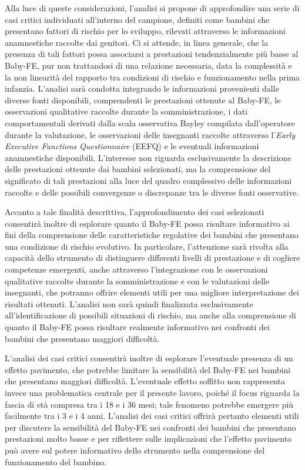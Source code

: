 Alla luce di queste considerazioni, l'analisi si propone di approfondire una serie di casi critici individuati all'interno del campione, definiti come bambini che presentano fattori di rischio per lo sviluppo, rilevati attraverso le informazioni anamnestiche raccolte dai genitori. Ci si attende, in linea generale, che la presenza di tali fattori possa associarsi a prestazioni tendenzialmente più basse al Baby-FE, pur non trattandosi di una relazione necessaria, data la complessità e la non linearità del rapporto tra condizioni di rischio e funzionamento nella prima infanzia. L'analisi sarà condotta integrando le informazioni provenienti dalle diverse fonti disponibili, comprendenti le prestazioni ottenute al Baby-FE, le osservazioni qualitative raccolte durante la somministrazione, i dati comportamentali derivati dalla scala osservativa Bayley compilata dall'operatore durante la valutazione, le osservazioni delle insegnanti raccolte attraverso l'\emph{Early Executive Functions Questionnaire} (EEFQ) e le eventuali informazioni anamnestiche disponibili. L'interesse non riguarda esclusivamente la descrizione delle prestazioni ottenute dai bambini selezionati, ma la comprensione del significato di tali prestazioni alla luce del quadro complessivo delle informazioni raccolte e delle possibili convergenze o discrepanze tra le diverse fonti osservative.

Accanto a tale finalità descrittiva, l'approfondimento dei casi selezionati consentirà inoltre di esplorare quanto il Baby-FE possa risultare informativo ai fini della comprensione delle caratteristiche regolative dei bambini che presentano una condizione di rischio evolutivo. In particolare, l'attenzione sarà rivolta alla capacità dello strumento di distinguere differenti livelli di prestazione e di cogliere competenze emergenti, anche attraverso l'integrazione con le osservazioni qualitative raccolte durante la somministrazione e con le valutazioni delle insegnanti, che potranno offrire elementi utili per una migliore interpretazione dei risultati ottenuti. L'analisi non sarà quindi finalizzata esclusivamente all'identificazione di possibili situazioni di rischio, ma anche alla comprensione di quanto il Baby-FE possa risultare realmente informativo nei confronti dei bambini che presentano maggiori difficoltà.

L'analisi dei casi critici consentirà inoltre di esplorare l'eventuale presenza di un effetto pavimento, che potrebbe limitare la sensibilità del Baby-FE nei bambini che presentano maggiori difficoltà. L'eventuale effetto soffitto non rappresenta invece una problematica centrale per il presente lavoro, poiché il focus riguarda la fascia di età compresa tra i 18 e i 36 mesi; tale fenomeno potrebbe emergere più facilmente tra i 3 e i 4 anni. L'analisi dei casi critici offrirà pertanto elementi utili per discutere la sensibilità del Baby-FE nei confronti dei bambini che presentano prestazioni molto basse e per riflettere sulle implicazioni che l'effetto pavimento può avere sul potere informativo dello strumento nella comprensione del funzionamento del bambino.

